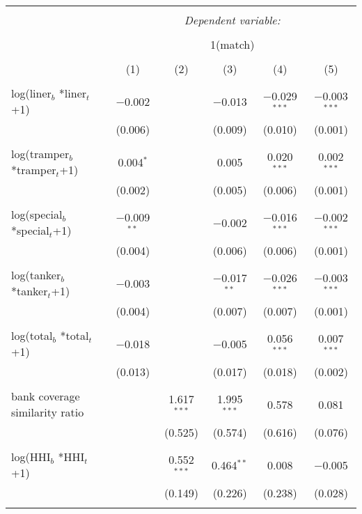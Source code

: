 
\begin{tabular}{@{\extracolsep{5pt}}lccccc} 
\\[-1.8ex]\hline 
\hline \\[-1.8ex] 
 & \multicolumn{5}{c}{\textit{Dependent variable:}} \\ 
\cline{2-6} 
\\[-1.8ex] & \multicolumn{5}{c}{1(match)} \\ 
\\[-1.8ex] & (1) & (2) & (3) & (4) & (5)\\ 
\hline \\[-1.8ex] 
 log(liner$_{b}$ *liner$_{t}$+1) & $-$0.002 &  & $-$0.013 & $-$0.029$^{***}$ & $-$0.003$^{***}$ \\ 
  & (0.006) &  & (0.009) & (0.010) & (0.001) \\ 
  & & & & & \\ 
 log(tramper$_{b}$ *tramper$_{t}$+1) & 0.004$^{*}$ &  & 0.005 & 0.020$^{***}$ & 0.002$^{***}$ \\ 
  & (0.002) &  & (0.005) & (0.006) & (0.001) \\ 
  & & & & & \\ 
 log(special$_{b}$ *special$_{t}$+1) & $-$0.009$^{**}$ &  & $-$0.002 & $-$0.016$^{***}$ & $-$0.002$^{***}$ \\ 
  & (0.004) &  & (0.006) & (0.006) & (0.001) \\ 
  & & & & & \\ 
 log(tanker$_{b}$ *tanker$_{t}$+1) & $-$0.003 &  & $-$0.017$^{**}$ & $-$0.026$^{***}$ & $-$0.003$^{***}$ \\ 
  & (0.004) &  & (0.007) & (0.007) & (0.001) \\ 
  & & & & & \\ 
 log(total$_{b}$ *total$_{t}$+1) & $-$0.018 &  & $-$0.005 & 0.056$^{***}$ & 0.007$^{***}$ \\ 
  & (0.013) &  & (0.017) & (0.018) & (0.002) \\ 
  & & & & & \\ 
 bank coverage similarity ratio &  & 1.617$^{***}$ & 1.995$^{***}$ & 0.578 & 0.081 \\ 
  &  & (0.525) & (0.574) & (0.616) & (0.076) \\ 
  & & & & & \\ 
 log(HHI$_{b}$ *HHI$_{t}$+1) &  & 0.552$^{***}$ & 0.464$^{**}$ & 0.008 & $-$0.005 \\ 
  &  & (0.149) & (0.226) & (0.238) & (0.028) \\ 
  & & & & & \\ 

\end{tabular}
